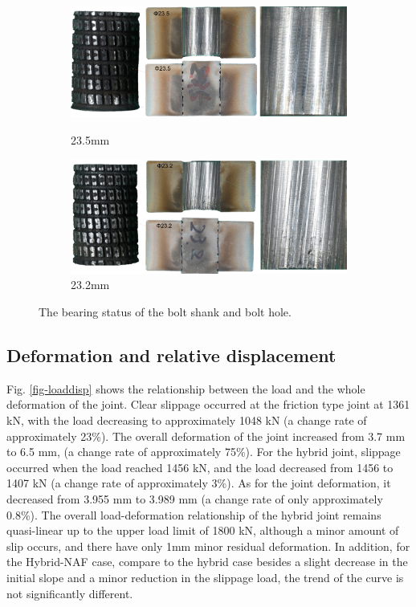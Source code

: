 \begin{figure}
\centering
\begin{subfigure}[t]{0.9\textwidth}
    \centering
    \includegraphics[width=\textwidth]{imgs/ch6/bstatus-23-5.pdf}
    \label{fig-bstatus235}
    \caption{23.5mm}
\end{subfigure}
\hfill
\begin{subfigure}[t]{0.9\textwidth}
    \centering
    \includegraphics[width=\textwidth]{imgs/ch6/bstatus-23-2.pdf}
    \caption{23.2mm}
\end{subfigure}
\caption{The bearing status of the bolt shank and bolt hole.}
\label{fig-bcrossec}
\end{figure}


\subsection{Deformation and relative displacement}

Fig. \ref{fig-loaddisp} shows the relationship between the load and the whole deformation of the joint. Clear slippage occurred at the friction type joint at 1361 kN, with the load decreasing to approximately 1048 kN (a change rate of approximately 23\%). The overall deformation of the joint increased from 3.7 mm to 6.5 mm, (a change rate of approximately 75\%). For the hybrid joint, slippage occurred when the load reached 1456 kN, and the load decreased from 1456 to 1407 kN (a change rate of approximately 3\%). As for the joint deformation, it decreased from 3.955 mm to 3.989 mm (a change rate of only approximately 0.8\%). The overall load-deformation relationship of the hybrid joint remains quasi-linear up to the upper load limit of 1800 kN, although a minor amount of slip occurs, and there have only 1mm minor residual deformation. In addition, for the Hybrid-NAF case, compare to the hybrid case besides a slight decrease in the initial slope and a minor reduction in the slippage load, the trend of the curve is not significantly different.

